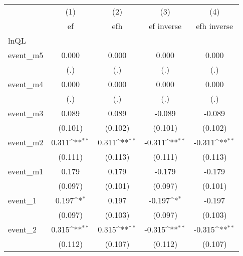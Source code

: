 {
\def\sym#1{\ifmmode^{#1}\else\(^{#1}\)\fi}
\begin{tabular}{l*{4}{c}}
\hline\hline
            &\multicolumn{1}{c}{(1)}&\multicolumn{1}{c}{(2)}&\multicolumn{1}{c}{(3)}&\multicolumn{1}{c}{(4)}\\
            &\multicolumn{1}{c}{ef}&\multicolumn{1}{c}{efh}&\multicolumn{1}{c}{ef inverse}&\multicolumn{1}{c}{efh inverse}\\
\hline
lnQL        &                     &                     &                     &                     \\
event\_m5    &       0.000         &       0.000         &       0.000         &       0.000         \\
            &         (.)         &         (.)         &         (.)         &         (.)         \\
[1em]
event\_m4    &       0.000         &       0.000         &       0.000         &       0.000         \\
            &         (.)         &         (.)         &         (.)         &         (.)         \\
[1em]
event\_m3    &       0.089         &       0.089         &      -0.089         &      -0.089         \\
            &     (0.101)         &     (0.102)         &     (0.101)         &     (0.102)         \\
[1em]
event\_m2    &       0.311\sym{**} &       0.311\sym{**} &      -0.311\sym{**} &      -0.311\sym{**} \\
            &     (0.111)         &     (0.113)         &     (0.111)         &     (0.113)         \\
[1em]
event\_m1    &       0.179         &       0.179         &      -0.179         &      -0.179         \\
            &     (0.097)         &     (0.101)         &     (0.097)         &     (0.101)         \\
[1em]
event\_1     &       0.197\sym{*}  &       0.197         &      -0.197\sym{*}  &      -0.197         \\
            &     (0.097)         &     (0.103)         &     (0.097)         &     (0.103)         \\
[1em]
event\_2     &       0.315\sym{**} &       0.315\sym{**} &      -0.315\sym{**} &      -0.315\sym{**} \\
            &     (0.112)         &     (0.107)         &     (0.112)         &     (0.107)         \\

\end{tabular}}
